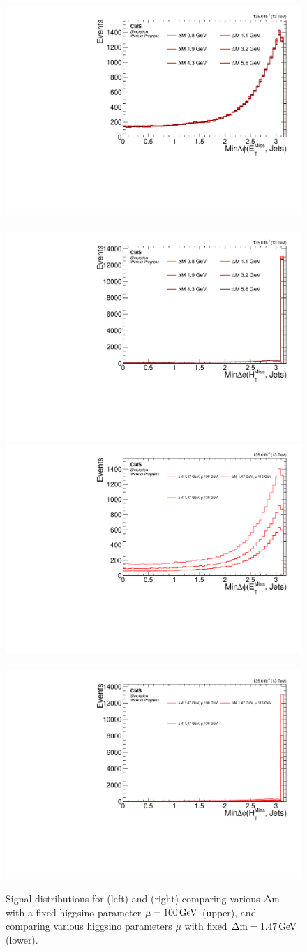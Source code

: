 \begin{figure}[!htb]
\centering
\includegraphics[width=0.48\linewidth]{plots/signal_common_distributions_fixed_mu/none_MinDeltaPhiMetJets.pdf} \,
\includegraphics[width=0.48\linewidth]{plots/signal_common_distributions_fixed_mu/none_MinDeltaPhiMhtJets.pdf}  \\
\includegraphics[width=0.48\linewidth]{plots/signal_common_distributions_fixed_dm/none_MinDeltaPhiMetJets.pdf} \,
\includegraphics[width=0.48\linewidth]{plots/signal_common_distributions_fixed_dm/none_MinDeltaPhiMhtJets.pdf}  \\
\caption[Signal $\mindphimetjets$ and $\mindphimhtjets$ distributions]{ Signal distributions for \mindphimetjets (left) and \mindphimhtjets (right) comparing various $\Delta\mathrm{m}$ with a fixed higgsino parameter $\mu=100\,\text{Ge\hspace{-.08em}V}$ (upper), and comparing various higgsino parameters $\mu$ with fixed $\Delta\mathrm{m}=1.47\,\text{Ge\hspace{-.08em}V}$ (lower).}
\label{fig:signal-min-deltaphi-met-mht}
\end{figure}

